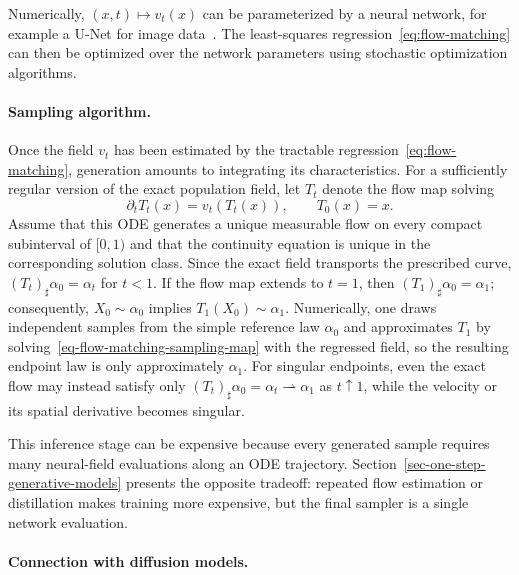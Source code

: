 %
Numerically, $(x,t) \mapsto v_t(x)$ can be parameterized by a neural network, for example a U-Net for image data~\cite{RonnebergerFischerBrox2015UNet}. The least-squares regression~\eqref{eq:flow-matching} can then be optimized over the network parameters using stochastic optimization algorithms.
%

\paragraph{Sampling algorithm.}
Once the field $v_t$ has been estimated by the tractable regression~\eqref{eq:flow-matching}, generation amounts to integrating its characteristics. For a sufficiently regular version of the exact population field, let $T_t$ denote the flow map solving
\begin{equation}\label{eq-flow-matching-sampling-map}
	\partial_tT_t(x)=v_t(T_t(x)),
	\qquad T_0(x)=x.
\end{equation}
Assume that this ODE generates a unique measurable flow on every compact subinterval of $[0,1)$ and that the continuity equation is unique in the corresponding solution class. Since the exact field transports the prescribed curve, $(T_t)_\sharp\alpha_0=\alpha_t$ for $t<1$. If the flow map extends to $t=1$, then $(T_1)_\sharp\alpha_0=\alpha_1$; consequently, $X_0\sim\alpha_0$ implies $T_1(X_0)\sim\alpha_1$. Numerically, one draws independent samples from the simple reference law $\alpha_0$ and approximates $T_1$ by solving~\eqref{eq-flow-matching-sampling-map} with the regressed field, so the resulting endpoint law is only approximately $\alpha_1$. For singular endpoints, even the exact flow may instead satisfy only $(T_t)_\sharp\alpha_0=\alpha_t\rightharpoonup\alpha_1$ as $t\uparrow1$, while the velocity or its spatial derivative becomes singular.

This inference stage can be expensive because every generated sample requires many neural-field evaluations along an ODE trajectory. Section~\ref{sec-one-step-generative-models} presents the opposite tradeoff: repeated flow estimation or distillation makes training more expensive, but the final sampler is a single network evaluation.

\paragraph{Connection with diffusion models.}\label{par-diffusion-model-connection}

